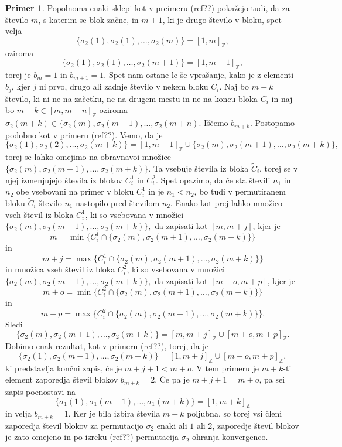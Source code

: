 \documentclass[12pt,a4paper,reqno]{amsart}
\theoremstyle{definition} %
\newtheorem{primer}[definicija]{Primer}
\theoremstyle{plain} %
\newcommand{\Z}{\mathbb Z}
\begin{document}
\begin{primer}
Popolnoma enaki sklepi kot v preimeru (ref??) pokažejo tudi, da za število $m$, s katerim se blok začne, in $m+1$, ki je drugo število v bloku, spet velja $$\{\sigma_2(1), \sigma_2(1), \ldots, \sigma_2(m) \}=[1,m]_{\Z},$$ oziroma $$\{\sigma_2(1), \sigma_2(1), \ldots, \sigma_2(m+1) \}=[1,m+1]_{\Z},$$ torej je $b_m=1$ in $b_{m+1}=1$.
Spet nam ostane le še vprašanje, kako je z elementi $b_j$, kjer $j$ ni prvo, drugo ali zadnje število v nekem bloku $C_i$. 
Naj bo $m+k$ število, ki ni ne na začetku, ne na drugem mestu in ne na koncu bloka $C_i$ in naj bo $m+k \in [m,m+n]_{\Z}$ oziroma $\sigma_2(m+k) \in \{\sigma_2(m), \sigma_2(m+1), \ldots, \sigma_2(m+n)$. Iščemo $b_{m+k}$. Postopamo podobno kot v primeru (ref??). 
Vemo, da je $$\{ \sigma_2(1), \sigma_2(2), \ldots, \sigma_2(m+k) \}=[1,m-1]_{\Z}\cup \{ \sigma_2(m), \sigma_2(m+1), \ldots, \sigma_2(m+k) \},$$
torej se lahko omejimo na obravnavoi množice $\{ \sigma_2(m), \sigma_2(m+1), \ldots, \sigma_2(m+k) \}.$ Ta vsebuje števila iz bloka $\tilde{C}_i$, torej se v njej izmenjujejo števila iz blokov $C_i^1$ in $C_i^2$. Spet opazimo, da če sta števili $n_1$ in $n_2$ obe vsebovani na primer v bloku $C_i^1$ in je $n_1<n_2$, bo tudi v permutiranem bloku $\tilde{C}_i$ število $n_1$ nastopilo pred številom $n_2$.
Enako kot prej lahko množico vseh števil iz bloka $C_i^1$, ki so vsebovana v množici $\{ \sigma_2(m), \sigma_2(m+1), \ldots, \sigma_2(m+k) \},$ da zapisati kot $[m,m+j]$, kjer je $$m=\min \{C_i^1 \cap \{ \sigma_2(m), \sigma_2(m+1), \ldots, \sigma_2(m+k) \} \}$$
in $$m+j=\max \{C_i^1 \cap \{ \sigma_2(m), \sigma_2(m+1), \ldots, \sigma_2(m+k) \} \}$$
in množica vseh števil iz bloka $C_i^2$, ki so vsebovana v množici $\{ \sigma_2(m), \sigma_2(m+1), \ldots, \sigma_2(m+k) \},$ da zapisati kot $[m+o,m+p]$, kjer je $$m+o=\min \{C_i^2 \cap \{ \sigma_2(m), \sigma_2(m+1), \ldots, \sigma_2(m+k) \} \}$$
in $$m+p=\max \{C_i^2 \cap \{ \sigma_2(m), \sigma_2(m+1), \ldots, \sigma_2(m+k) \} \}.$$
Sledi $$\{ \sigma_2(m), \sigma_2(m+1), \ldots, \sigma_2(m+k) \}=[m,m+j]_{\Z} \cup [m+o,m+p]_{\Z}.$$
Dobimo enak rezultat, kot v primeru (ref??), torej, da je $$\{ \sigma_2(1), \sigma_2(m+1), \ldots, \sigma_2(m+k) \}= [1,m+j]_{\Z} \cup [m+o,m+p]_{\Z},$$
ki predstavlja končni zapis, če je $m+j+1<m+o$. V tem primeru je $m+k$-ti element zaporedja števil blokov $b_{m+k}=2$. Če pa je $m+j+1=m+o$, pa sei zapis poenostavi na $$\{ \sigma_1(1), \sigma_1(m+1), \ldots, \sigma_1(m+k) \}=[1,m+k]_{\Z}$$
in velja $b_{m+k}=1$.
Ker je bila izbira števila $m+k$ poljubna, so torej vsi členi zaporedja števil blokov za permutacijo $\sigma_2$ enaki ali $1$ ali $2$, zaporedje števil blokov je zato omejeno in po izreku (ref??) permutacija $\sigma_2$ ohranja konvergenco.


\end{primer}
\end{document}
